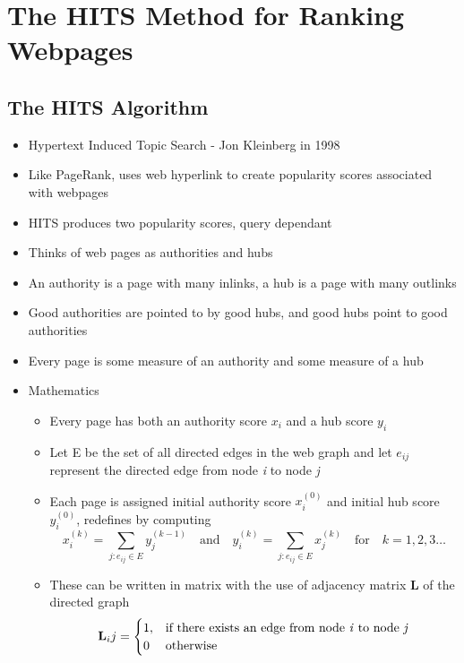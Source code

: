 \documentclass[11pt]{report}
\begin{document}
\chapter{The HITS Method for Ranking Webpages}
\section{The HITS Algorithm}
\begin{itemize}
\item Hypertext Induced Topic Search - Jon Kleinberg in 1998
\item Like PageRank, uses web hyperlink to create popularity scores associated with webpages
\item HITS produces two popularity scores, query dependant
\item Thinks of web pages as authorities and hubs
\item An authority is a page with many inlinks, a hub is a page with many outlinks
\item Good authorities are pointed to by good hubs, and good hubs point to good authorities
\item Every page is some measure of an authority and some measure of a hub
\item Mathematics
\begin{itemize}
\item Every page has both an authority score $x_i$ and a hub score $y_i$
\item Let E be the set of all directed edges in the web graph and let $e_{ij}$ represent the directed edge from node \textit{i} to node \textit{j}
\item Each page is assigned initial authority score $x_i^{(0)}$ and initial hub score $y_i^{(0)}$, redefines by computing \begin{equation}
x_i^{(k)} = \displaystyle \sum_{j:e_{ij}\in E} y_j^{(k-1)} \quad\mathrm{and}\quad y_i^{(k)} = \displaystyle \sum_{j:e_{ij}\in E} x_j^{(k)}  \quad\mathrm{for}\quad k=1,2,3\ldots
\end{equation}
\item These can be written in matrix with the use of adjacency matrix \textbf{L} of the directed graph \begin{equation}
\textbf{L}_ij = \begin{cases} 1, & \textnormal{if there exists an edge from node \textit{i} to node \textit{j}}\\ 0 & \textnormal{otherwise}
\end{cases}
\end{equation}

\end{itemize}
\end{itemize}
\end{document}
